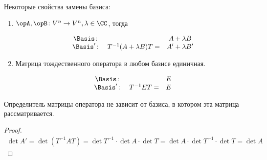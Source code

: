 Некоторые свойства замены базиса:
\begin{enumerate}
  \item \(\opA, \opB \colon V^{n} \to V^{n}, \lambda \in \CC\), тогда
  
  \begin{align*}
    \begin{matrix}
      \Basis \colon && A + \lambda B \\
      \Basis' \colon & T^{-1} (A + \lambda B) T = & A' + \lambda B'\\
    \end{matrix}
  \end{align*}

  \item Матрица тождественного оператора в любом базисе единичная.
  
  \begin{align*}
    \begin{matrix}
      \Basis \colon && E \\
      \Basis' \colon & T^{-1} E T = & E\\
    \end{matrix}
  \end{align*}

\end{enumerate}

\begin{lemma}
  Определитель матрицы оператора не зависит от базиса, в котором эта матрица
  рассматривается.
\end{lemma}
\begin{proof}
  \begin{align*}
    \det A'
    = \det (T^{-1} A T)
    = \det T^{-1} \cdot \det A \cdot \det T
    = \det A \cdot \det T^{-1} \cdot \det T
    = \det A
  \end{align*}
\end{proof}